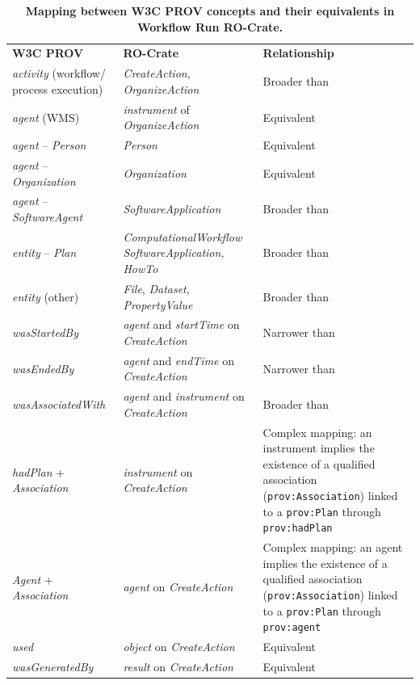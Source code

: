 \documentclass[10pt,letterpaper]{article}
\newlength\savedwidth
\newcommand\thickhline{\noalign{\global\savedwidth\arrayrulewidth\global\arrayrulewidth 2pt}%
\hline
\noalign{\global\arrayrulewidth\savedwidth}}
\begin{document}
\begin{table}[!ht]
  \begin{adjustwidth}{-1.5cm}{0in}
  \centering
  \caption{
  {\bf Mapping between W3C PROV concepts and their equivalents in Workflow Run RO-Crate.}}
  \begin{tabular}{p{35mm}|p{40mm}|p{40mm}}
  \hline
  {\bf W3C PROV} & {\bf RO-Crate} & \textbf{Relationship} \\
  \thickhline
  
  \emph{activity} (workflow/ \newline process execution) 
    & \emph{CreateAction}, \emph{OrganizeAction} & Broader than \\ \hline
  \emph{agent} (WMS) & \emph{instrument} of \emph{OrganizeAction} & Equivalent \\ \hline
  \emph{agent} -- \emph{Person} & \emph{Person}  & Equivalent \\ \hline
  \emph{agent} -- \emph{Organization} & \emph{Organization}  & Equivalent \\ \hline
  \emph{agent} -- \emph{SoftwareAgent} & \emph{SoftwareApplication}  & Broader than \\ \hline
  \emph{entity} -- \emph{Plan} & 
    \emph{ComputationalWorkflow} \emph{SoftwareApplication, HowTo}  
    & Broader than \\ \hline
  \emph{entity} (other) & \emph{File}, \emph{Dataset}, \emph{PropertyValue} & Broader than \\ \hline
  \emph{wasStartedBy} & \emph{agent} and \emph{startTime} on  \emph{CreateAction} & Narrower than  \\ \hline
  \emph{wasEndedBy} & \emph{agent} and \emph{endTime} on  \emph{CreateAction} & Narrower than \\ \hline
  \emph{wasAssociatedWith} & \emph{agent} and \emph{instrument} on  \emph{CreateAction} & Broader than \\ \hline
  \emph{hadPlan} + \emph{Association} &  \emph{instrument} on \emph{CreateAction} & 
    Complex mapping: an instrument implies the existence of a qualified association (\texttt{prov:Association}) linked to a \texttt{prov:Plan} through \texttt{prov:hadPlan}
    \\ \hline
  \emph{Agent} + \emph{Association} &  \emph{agent} on \emph{CreateAction} & 
    Complex mapping: an agent implies the existence of a qualified association (\texttt{prov:Association}) linked to a \texttt{prov:Plan} through \texttt{prov:agent}
    \\ \hline  
  \emph{used} & \emph{object} on \emph{CreateAction} & Equivalent \\ \hline 
  \emph{wasGeneratedBy} & \emph{result} on  \emph{CreateAction} & Equivalent \\ \hline
  
  \end{tabular}
  \label{rocrate_prov_mapping}
  \end{adjustwidth}
  \end{table}
  
\end{document}
